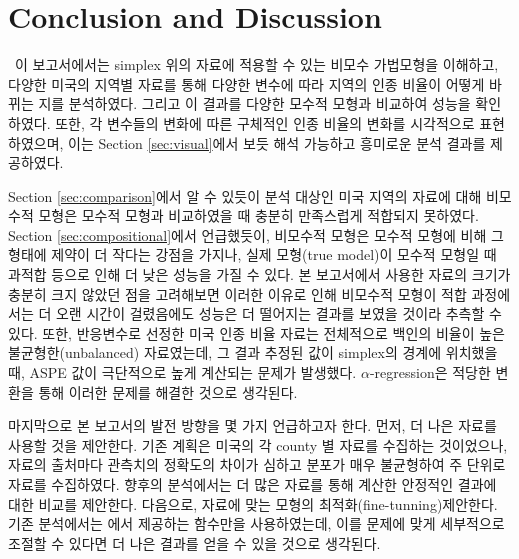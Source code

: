 \section{Conclusion and Discussion}\label{sec:conclusion}

\ \quad 이 보고서에서는 simplex 위의 자료에 적용할 수 있는 비모수 가법모형을 이해하고, 다양한 미국의 지역별 자료를 통해 다양한 변수에 따라 지역의 인종 비율이 어떻게 바뀌는 지를 분석하였다. 그리고 이 결과를 다양한 모수적 모형과 비교하여 성능을 확인하였다. 또한, 각 변수들의 변화에 따른 구체적인 인종 비율의 변화를 시각적으로 표현하였으며, 이는 Section \ref{sec:visual}에서 보듯 해석 가능하고 흥미로운 분석 결과를 제공하였다.

Section \ref{sec:comparison}에서 알 수 있듯이 분석 대상인 미국 지역의 자료에 대해 비모수적 모형은 모수적 모형과 비교하였을 때 충분히 만족스럽게 적합되지 못하였다. Section \ref{sec:compositional}에서 언급했듯이, 비모수적 모형은 모수적 모형에 비해 그 형태에 제약이 더 작다는 강점을 가지나, 실제 모형(true model)이 모수적 모형일 때 과적합 등으로 인해 더 낮은 성능을 가질 수 있다.
본 보고서에서 사용한 자료의 크기가 충분히 크지 않았던 점을 고려해보면 이러한 이유로 인해 비모수적 모형이 적합 과정에서는 더 오랜 시간이 걸렸음에도 성능은 더 떨어지는 결과를 보였을 것이라 추측할 수 있다. 또한, 반응변수로 선정한 미국 인종 비율 자료는 전체적으로 백인의 비율이 높은 불균형한(unbalanced) 자료였는데, 그 결과 추정된 값이 simplex의 경계에 위치했을 때, ASPE 값이 극단적으로 높게 계산되는 문제가 발생했다. $\alpha$-regression은 적당한 변환을 통해 이러한 문제를 해결한 것으로 생각된다.

마지막으로 본 보고서의 발전 방향을 몇 가지 언급하고자 한다. 먼저, 더 나은 자료를 사용할 것을 제안한다. 기존 계획은 미국의 각 county 별 자료를 수집하는 것이었으나, 자료의 출처마다 관측치의 정확도의 차이가 심하고 분포가 매우 불균형하여 주 단위로 자료를 수집하였다. 향후의 분석에서는 더 많은 자료를 통해 계산한 안정적인 결과에 대한 비교를 제안한다. 다음으로, 자료에 맞는 모형의 최적화(fine-tunning)\를 제안한다. 기존 분석에서는 \citet{jeon2018additive}에서 제공하는 함수만을 사용하였는데, 이를 문제에 맞게 세부적으로 조절할 수 있다면 더 나은 결과를 얻을 수 있을 것으로 생각된다. 

